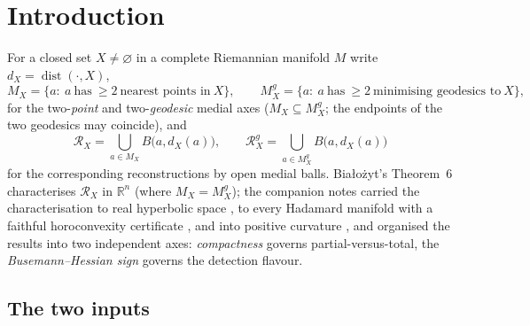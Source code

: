 \documentclass[11pt]{article}
\theoremstyle{remark}
\newcommand{\R}{\mathbb{R}}
\newcommand{\X}{X}
\newcommand{\Mx}{M_{\X}}
\newcommand{\Mg}{M^{g}_{\X}}
\newcommand{\Rx}{\mathcal{R}_{\X}}
\newcommand{\Rg}{\mathcal{R}^{g}_{\X}}
\newcommand{\dist}{\operatorname{dist}}
\newcommand{\dX}{d_{\X}}
\begin{document}
\tableofcontents

\section{Introduction}\label{sec:intro}

For a closed set $\X\neq\varnothing$ in a complete Riemannian manifold
$M$ write $\dX=\dist(\cdot,\X)$,
\[
  \Mx=\{a:\ a\ \text{has}\ \ge2\ \text{nearest points in}\ \X\},
  \qquad
  \Mg=\{a:\ a\ \text{has}\ \ge2\ \text{minimising geodesics to}\ \X\},
\]
for the two-\emph{point} and two-\emph{geodesic} medial axes
($\Mx\subseteq\Mg$; the endpoints of the two geodesics may coincide),
and
\[
  \Rx=\bigcup_{a\in\Mx}B\bigl(a,\dX(a)\bigr),\qquad
  \Rg=\bigcup_{a\in\Mg}B\bigl(a,\dX(a)\bigr)
\]
for the corresponding reconstructions by open medial balls.
Bia\l{}o\.zyt's Theorem~6 \cite{Bia} characterises $\Rx$ in $\R^{n}$
(where $\Mx=\Mg$); the companion notes carried the characterisation to
real hyperbolic space \cite{R2}, to every Hadamard manifold with a
faithful horoconvexity certificate \cite{R1,R3}, and into positive
curvature \cite{Sph}, and \cite{Tri} organised the results into two
independent axes: \emph{compactness} governs partial-versus-total,
the \emph{Busemann--Hessian sign} governs the detection flavour.


\subsection*{The two inputs}
\end{document}

